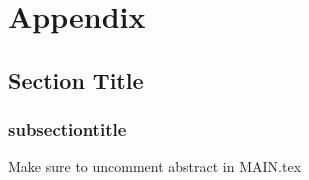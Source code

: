 \chapter{Appendix}
\section{Section Title}
\subsection{subsectiontitle}
Make sure to uncomment abstract in MAIN.tex